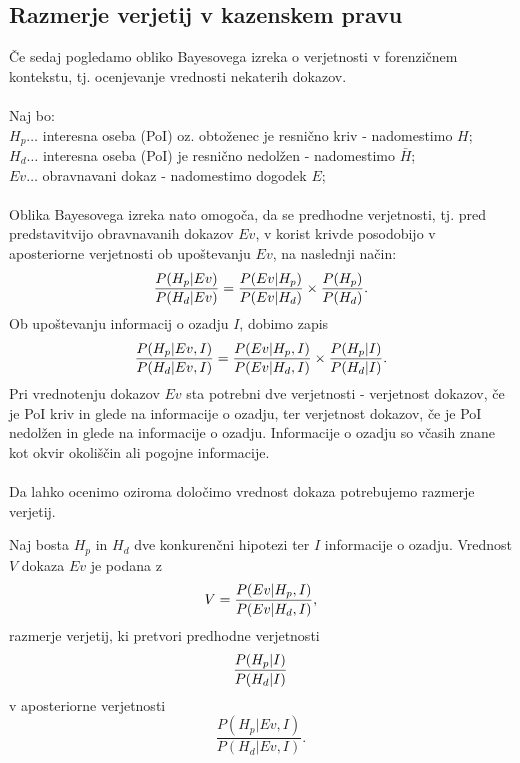 \documentclass[fin1, tisk]{fmfdelo}
\theoremstyle{definition}
\theoremstyle{trditev}
\theoremstyle{izrek}
\begin{document}
\subsection{Razmerje verjetij v kazenskem pravu}
Če sedaj pogledamo obliko Bayesovega izreka o verjetnosti v forenzičnem kontekstu, tj. ocenjevanje vrednosti nekaterih dokazov.\\\\
Naj bo:\\
$H_p \dots$ interesna oseba (PoI) oz. obtoženec je resnično kriv - nadomestimo $H$;\\
$H_d \dots$ interesna oseba (PoI) je resnično nedolžen - nadomestimo $\bar{H}$;\\
$Ev \dots$ obravnavani dokaz - nadomestimo dogodek $E$;\\\\
Oblika Bayesovega izreka nato omogoča, da se predhodne verjetnosti, tj. pred predstavitvijo obravnavanih dokazov $Ev$, v korist krivde posodobijo v 
aposteriorne verjetnosti ob upoštevanju $Ev$, na naslednji način:
\[
   \frac{P(H_p \lvert Ev)}{P(H_d \lvert Ev)} = \frac{P(Ev \lvert H_p)}{P(Ev \lvert H_d)} \times \frac{P(H_p)}{P(H_d)}. \vspace{2mm}
\]
Ob upoštevanju informacij o ozadju $I$, dobimo zapis
\[
   \frac{P(H_p \lvert Ev, I)}{P(H_d \lvert Ev, I)} = \frac{P(Ev \lvert H_p, I)}{P(Ev \lvert H_d, I)} \times \frac{P(H_p \lvert I)}{P(H_d \lvert I)}. \vspace{2mm}
\]
Pri vrednotenju dokazov $Ev$ sta potrebni dve verjetnosti - verjetnost dokazov, če je PoI kriv in glede na informacije o ozadju, ter
verjetnost dokazov, če je PoI nedolžen in glede na informacije o ozadju. Informacije o ozadju so včasih znane kot okvir okoliščin
ali pogojne informacije. \\\\
Da lahko ocenimo oziroma določimo vrednost dokaza potrebujemo razmerje verjetij.
\begin{definicija}
    Naj bosta  $H_p$ in $H_d$ dve konkurenčni hipotezi ter $I$ informacije o ozadju. Vrednost $V$ dokaza $Ev$ je podana z
    \[
        V = \frac{P(Ev \lvert H_p, I)}{P(Ev \lvert H_d, I)}, \vspace{2mm}
    \]
    razmerje verjetij, ki pretvori predhodne verjetnosti
    \[
        \frac{P(H_p \lvert I)}{P(H_d \lvert I)} \vspace{2mm}
    \]
    v aposteriorne verjetnosti
    \[
        \frac{P(H_p \lvert Ev, I)}{P(H_d \lvert Ev, I)}.
    \]
\end{definicija}
\end{document}
